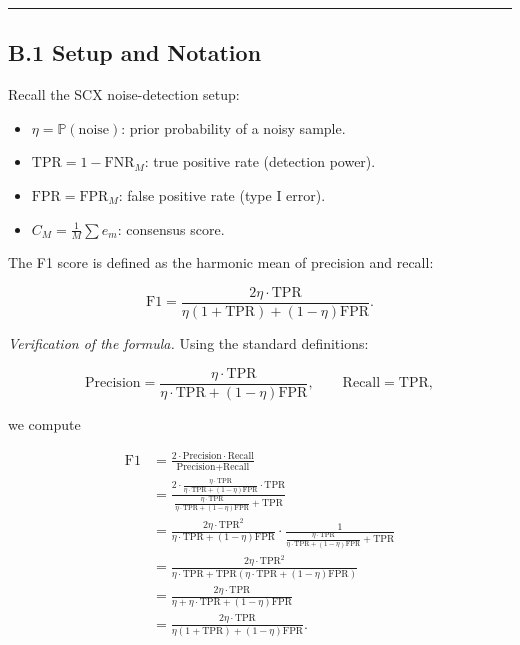 \documentclass[
  12pt,
]{article}
\providecommand{\tightlist}{%
  \setlength{\itemsep}{0pt}\setlength{\parskip}{0pt}}
\begin{document}
\begin{center}\rule{0.5\linewidth}{0.5pt}\end{center}

\subsection{B.1 Setup and Notation}\label{b.1-setup-and-notation}

Recall the SCX noise-detection setup:

\begin{itemize}
\tightlist
\item
  \(\eta = \mathbb{P}(\text{noise})\): prior probability of a noisy
  sample.
\item
  \(\text{TPR} = 1 - \text{FNR}_M\): true positive rate (detection
  power).
\item
  \(\text{FPR} = \text{FPR}_M\): false positive rate (type I error).
\item
  \(C_M = \frac{1}{M}\sum e_m\): consensus score.
\end{itemize}

The F1 score is defined as the harmonic mean of precision and recall:

\[\text{F1} = \frac{2\eta \cdot \text{TPR}}{\eta(1+\text{TPR}) + (1-\eta)\text{FPR}}.\]

\emph{Verification of the formula.} Using the standard definitions:

\[\text{Precision} = \frac{\eta \cdot \text{TPR}}{\eta \cdot \text{TPR} + (1-\eta)\text{FPR}}, \qquad
\text{Recall} = \text{TPR},\]

we compute

\[
\begin{aligned}
\text{F1} &= \frac{2 \cdot \text{Precision} \cdot \text{Recall}}{\text{Precision} + \text{Recall}} \\
&= \frac{2 \cdot \frac{\eta\cdot\text{TPR}}{\eta\cdot\text{TPR} + (1-\eta)\text{FPR}} \cdot \text{TPR}}
{\frac{\eta\cdot\text{TPR}}{\eta\cdot\text{TPR} + (1-\eta)\text{FPR}} + \text{TPR}} \\
&= \frac{2\eta\cdot\text{TPR}^2}{\eta\cdot\text{TPR} + (1-\eta)\text{FPR}}
\cdot \frac{1}{\frac{\eta\cdot\text{TPR}}{\eta\cdot\text{TPR} + (1-\eta)\text{FPR}} + \text{TPR}} \\
&= \frac{2\eta\cdot\text{TPR}^2}{\eta\cdot\text{TPR} + \text{TPR}(\eta\cdot\text{TPR} + (1-\eta)\text{FPR})} \\
&= \frac{2\eta\cdot\text{TPR}}{\eta + \eta\cdot\text{TPR} + (1-\eta)\text{FPR}} \\
&= \frac{2\eta\cdot\text{TPR}}{\eta(1+\text{TPR}) + (1-\eta)\text{FPR}}.
\end{aligned}
\]
\end{document}
